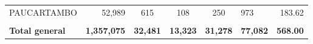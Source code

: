 \begin{tabular}{lrccclr}
	\cellcolor[HTML]{C6E0B4}PAUCARTAMBO                            & 52,989                                                         & 615                                                         & 108                  & 250                      & 973                                                                 & 183.62                                                                       \\
	& \multicolumn{1}{l}{}                                           & \multicolumn{1}{l}{}                                        & \multicolumn{1}{l}{} & \multicolumn{1}{l}{}     &                                                                     & \multicolumn{1}{l}{}                                                         \\
	\rowcolor[HTML]{DDEBF7} 
	\textbf{Total   general}                                       & \textbf{1,357,075}                                             & \multicolumn{1}{r}{\cellcolor[HTML]{DDEBF7}\textbf{32,481}} & \textbf{13,323}      & \textbf{31,278}          & \textbf{77,082}                                                     & \textbf{568.00}                                                             
\end{tabular}